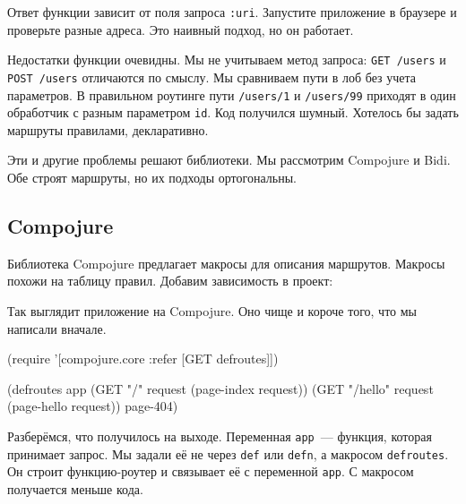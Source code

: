 Ответ функции зависит от поля запроса \verb|:uri|. Запустите приложение в
браузере и проверьте разные адреса. Это наивный подход, но он работает.

Недостатки функции очевидны. Мы не учитываем метод запроса: \verb|GET /users|
и \verb|POST /users| отличаются по смыслу. Мы сравниваем пути в лоб без учета
параметров. В правильном роутинге пути \verb|/users/1| и \verb|/users/99|
приходят в один обработчик с разным параметром \verb|id|. Код получился
шумный. Хотелось бы задать маршруты правилами, декларативно.

Эти и другие проблемы решают библиотеки. Мы рассмотрим Compojure и Bidi. Обе
строят маршруты, но их подходы ортогональны.

\subsection{Compojure}

\label{compojure}


Библиотека Compojure
предлагает макросы для описания маршрутов. Макросы похожи на таблицу правил.
Добавим зависимость в проект:

\begin{english}
  \begin{clojure}
[compojure "1.6.1"]
  \end{clojure}
\end{english}

Так выглядит приложение на Compojure. Оно чище и короче того, что мы написали
вначале.


\begin{english}
  \begin{clojure}
(require '[compojure.core :refer [GET defroutes]])

(defroutes app
  (GET "/"      request (page-index request))
  (GET "/hello" request (page-hello request))
  page-404)
  \end{clojure}
\end{english}

Разберёмся, что получилось на выходе. Переменная \verb|app|~--- функция,
которая принимает запрос. Мы задали её не через \verb|def| или \verb|defn|,
а макросом \verb|defroutes|. Он строит функцию-роутер и связывает её с
переменной \verb|app|. С макросом получается меньше кода.


